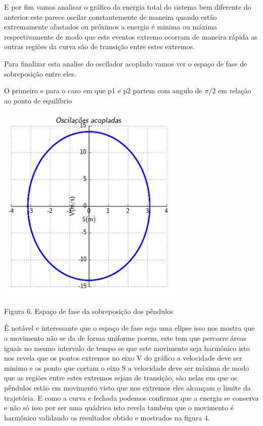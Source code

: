 \documentclass[a4paper]{article} %
\begin{document}
E por fim vamos analisar o gráfico da energia total do sistema bem diferente do anterior este parece oscilar constantemente de maneira quando estão extremamente afastados ou próximos a energia é minima ou máxima respectivamente de modo que este eventos extremo ocorram de maneira rápida as outras regiões da curva são de transição entre estes extremos.

Para finalizar esta analise do oscilador acoplado vamos ver o espaço de fase de sobreposição entre eles.

O primeiro e para o caso em que p1 e p2 partem com angulo de $\pi/2$ em relação ao ponto de equilíbrio  

\begin{center}
	\includegraphics[width=3.54in,height=3.78in, keepaspectratio=false]{pendulo_acoplado4.PNG}
	
	\scriptsize {Figura 6. Espaço de fase da sobreposição dos pêndulos }
\end{center}

É notável e interessante que o espaço de fase seja uma elipse isso nos mostra que o movimento não se da de forma uniforme porem, este tem que percorre áreas iguais no mesmo intervalo de tempo se que este movimento seja harmônico isto nos revela que os pontos extremos no eixo V do gráfico a velocidade deve ser minimo e os ponto que cortam o eixo S a velocidade deve ser máxima de modo que as regiões entre estes extremos sejam de transição, são nelas em que os pêndulos estão em movimento visto que nos extremos eles alcançam o limite da trajetória. E como a curva e fechada podemos confirmar que a energia se conserva e não só isso por ser uma quádrica isto revela também que o movimento é harmônico validando os resultados obtido e mostrados na figura 4. 
\end{document}
